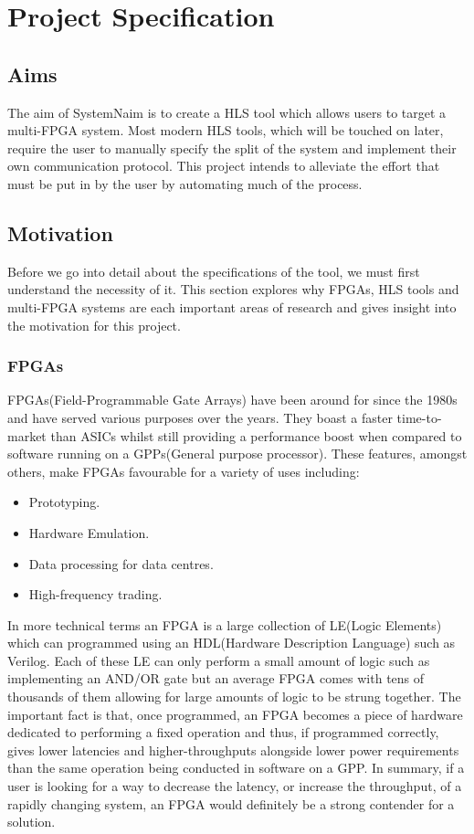 \chapter{Project Specification}

\section{Aims}

The aim of SystemNaim is to create a HLS tool which allows users to target a multi-FPGA system. Most modern HLS tools, which will be touched on later, require the user to manually specify the split of the system and implement their own communication protocol. This project intends to alleviate the effort that must be put in by the user by automating much of the process.

\section{Motivation}

Before we go into detail about the specifications of the tool, we must first understand the necessity of it. This section explores why FPGAs, HLS tools and multi-FPGA systems are each important areas of research and gives insight into the motivation for this project.

\subsection{FPGAs}

FPGAs(Field-Programmable Gate Arrays) have been around for since the 1980s and have served various purposes over the years\cite{fpga-history}. They boast a faster time-to-market than ASICs whilst still providing a performance boost when compared to software running on a GPPs(General purpose processor). These features, amongst others, make FPGAs favourable for a variety of uses including:
\begin{itemize}
    \item Prototyping.
    \item Hardware Emulation.
    \item Data processing for data centres.
    \item High-frequency trading.
 \end{itemize}

In more technical terms an FPGA is a large collection of LE(Logic Elements) which can programmed using an HDL(Hardware Description Language) such as Verilog. Each of these LE can only perform a small amount of logic such as implementing an AND/OR gate but an average FPGA comes with tens of thousands of them allowing for large amounts of logic to be strung together. The important fact is that, once programmed, an FPGA becomes a piece of hardware dedicated to performing a fixed operation and thus, if programmed correctly, gives lower latencies and higher-throughputs alongside lower power requirements than the same operation being conducted in software on a GPP. In summary, if a user is looking for a way to decrease the latency, or increase the throughput, of a rapidly changing system, an FPGA would definitely be a strong contender for a solution. 

